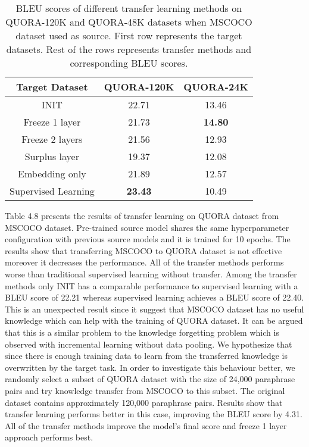 \begin{table}[t]
\centering
\large
 \begin{tabular}{|c | c | c |} 
 \hline
 Target Dataset & QUORA-120K & QUORA-24K \\ [0.5ex] 
 \hline
  INIT & 22.71 & 13.46  \\ 
 \hline
  Freeze 1 layer & 21.73 & \textbf{14.80}  \\ 
 \hline
  Freeze 2 layers & 21.56 & 12.93  \\ 
 \hline
  Surplus layer & 19.37 & 12.08  \\ 
 \hline
  Embedding only & 21.89 & 12.57  \\ 
 \hline
  Supervised Learning & \textbf{23.43} & 10.49  \\ 
 \hline
\end{tabular}
\caption{BLEU scores of different transfer learning methods on QUORA-120K and QUORA-48K datasets when MSCOCO dataset used as source. First row represents the target datasets. Rest of the rows represents transfer methods and corresponding BLEU scores.}
\end{table}

Table 4.8 presents the results of transfer learning on QUORA dataset from MSCOCO dataset. Pre-trained source model shares the same hyperparameter configuration with previous source models and it is trained for 10 epochs. The results show that transferring MSCOCO to QUORA dataset is not effective moreover it decreases the performance. All of the transfer methods performs worse than traditional supervised learning without transfer. Among the transfer methods only INIT has a comparable performance to supervised learning with a BLEU score of 22.21 whereas supervised learning achieves a BLEU score of 22.40. This is an unexpected result since it suggest that MSCOCO dataset has no useful knowledge which can help with the training of QUORA dataset. It can be argued that this is a similar problem to the knowledge forgetting problem which is observed with incremental learning without data pooling. We hypothesize that since there is enough training data to learn from the transferred knowledge is overwritten by the target task. In order to investigate this behaviour better, we randomly select a subset of QUORA dataset with the size of 24,000 paraphrase pairs and try knowledge transfer from MSCOCO to this subset. The original dataset contains approximately 120,000 paraphrase pairs. Results show that transfer learning performs better in this case, improving the BLEU score by 4.31. All of the transfer methods improve the model's final score and freeze 1 layer approach performs best.

